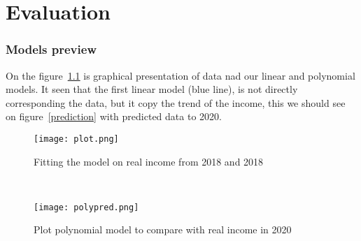 
\chapter{Evaluation}
\label{evaluation}
\subsection{Models preview}
On the figure~\ref{plot} is graphical presentation of data nad our linear and polynomial models. It seen that the first linear model (blue line), is not
directly corresponding the data, but it copy the trend of the income, this we should see on figure~\ref{prediction} with predicted data to 2020.
\begin{figure}[h!]
    \begin{center}
        \texttt{[image: plot.png]}
    \end{center}
    \caption{Fitting the model on real income from 2018 and 2018}
    \label{plot}
\end{figure}\\
\begin{figure}[h!]
    \begin{center}
        \texttt{[image: polypred.png]}
    \end{center}
    \caption{Plot polynomial model to compare with real income in 2020}
    \label{polypred}
\end{figure}\\
\newpage
